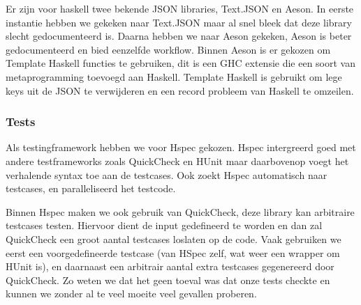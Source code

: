 Er zijn voor haskell twee bekende JSON libraries, Text.JSON en Aeson. In eerste instantie hebben we gekeken naar Text.JSON maar al snel bleek dat deze library slecht gedocumenteerd is. Daarna hebben we naar Aeson gekeken, Aeson is beter gedocumenteerd en bied eenzelfde workflow.
Binnen Aeson is er gekozen om Template Haskell functies te gebruiken, dit is een GHC extensie die een soort van metaprogramming toevoegd aan Haskell. Template Haskell is gebruikt om lege keys uit de JSON te verwijderen en een record probleem van Haskell te omzeilen.

\subsubsection{Tests}
Als testingframework hebben we voor Hspec gekozen. Hspec intergreerd goed met andere testframeworks zoals QuickCheck en HUnit maar daarbovenop voegt het verhalende syntax toe aan de testcases. Ook zoekt Hspec automatisch naar testcases, en paralleliseerd het testcode.

Binnen Hspec maken we ook gebruik van QuickCheck, deze library kan arbitraire testcases testen. Hiervoor dient de input gedefineerd te worden en dan zal QuickCheck een groot aantal testcases loslaten op de code. Vaak gebruiken we eerst een voorgedefineerde testcase (van HSpec zelf, wat weer een wrapper om HUnit is), en daarnaast een arbitrair aantal extra testcases gegenereerd door QuickCheck. Zo weten we dat het geen toeval was dat onze tests checkte en kunnen we zonder al te veel moeite veel gevallen proberen.
